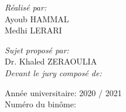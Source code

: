 \begin{titlepage}
\begin{center}
\normalsize
\begin{minipage}[t]{0.4\textwidth}
\begin{flushleft}
\large
\emph{Réalisé par:}\\
Ayoub \textsc{HAMMAL}\\
Medhi \textsc{LERARI}
\end{flushleft}
\end{minipage}
%
\begin{minipage}[t]{0.4\textwidth}
\begin{flushright} 
\large
\emph{Sujet proposé par:}\\
Dr. Khaled \textsc{ZERAOULIA}\\[1.5cm]
\emph{Devant le jury composé de:}\\
\end{flushright}
\end{minipage}

\vfill

{\large Année universitaire: 2020 / 2021}\\
{\large Numéro du binôme: }

\end{center}
\end{titlepage}